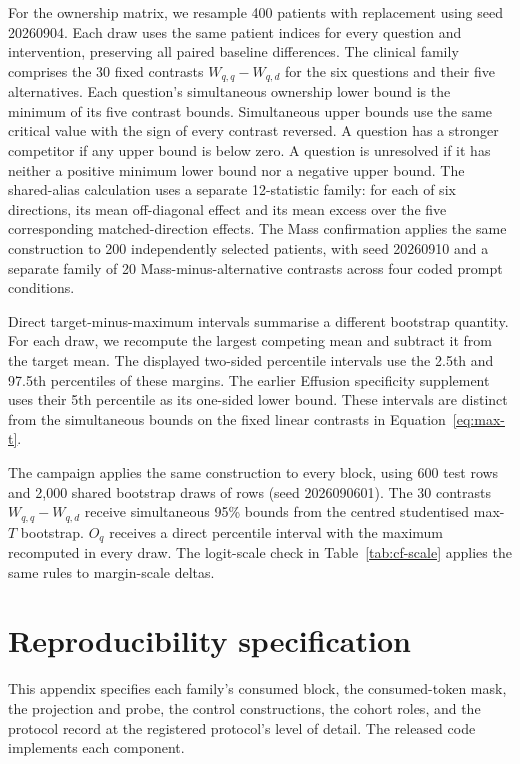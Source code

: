 \documentclass{article}
\begin{document}
For the ownership matrix, we resample 400 patients with replacement using seed 20260904. Each draw uses the same patient indices for every question and intervention, preserving all paired baseline differences. The clinical family comprises the 30 fixed contrasts $W_{q,q}-W_{q,d}$ for the six questions and their five alternatives. Each question's simultaneous ownership lower bound is the minimum of its five contrast bounds. Simultaneous upper bounds use the same critical value with the sign of every contrast reversed. A question has a stronger competitor if any upper bound is below zero. A question is unresolved if it has neither a positive minimum lower bound nor a negative upper bound. The shared-alias calculation uses a separate 12-statistic family: for each of six directions, its mean off-diagonal effect and its mean excess over the five corresponding matched-direction effects. The Mass confirmation applies the same construction to 200 independently selected patients, with seed 20260910 and a separate family of 20 Mass-minus-alternative contrasts across four coded prompt conditions.

Direct target-minus-maximum intervals summarise a different bootstrap quantity. For each draw, we recompute the largest competing mean and subtract it from the target mean. The displayed two-sided percentile intervals use the 2.5th and 97.5th percentiles of these margins. The earlier Effusion specificity supplement uses their 5th percentile as its one-sided lower bound. These intervals are distinct from the simultaneous bounds on the fixed linear contrasts in Equation~\ref{eq:max-t}.

The campaign applies the same construction to every block, using 600 test rows and 2{,}000 shared bootstrap draws of rows (seed 2026090601). The 30 contrasts $W_{q,q}-W_{q,d}$ receive simultaneous 95\% bounds from the centred studentised max-$T$ bootstrap. $O_q$ receives a direct percentile interval with the maximum recomputed in every draw. The logit-scale check in Table~\ref{tab:cf-scale} applies the same rules to margin-scale deltas.
\section{Reproducibility specification}
\label{app:repro}

This appendix specifies each family's consumed block, the consumed-token mask, the projection and probe, the control constructions, the cohort roles, and the protocol record at the registered protocol's level of detail. The released code implements each component.
\end{document}
